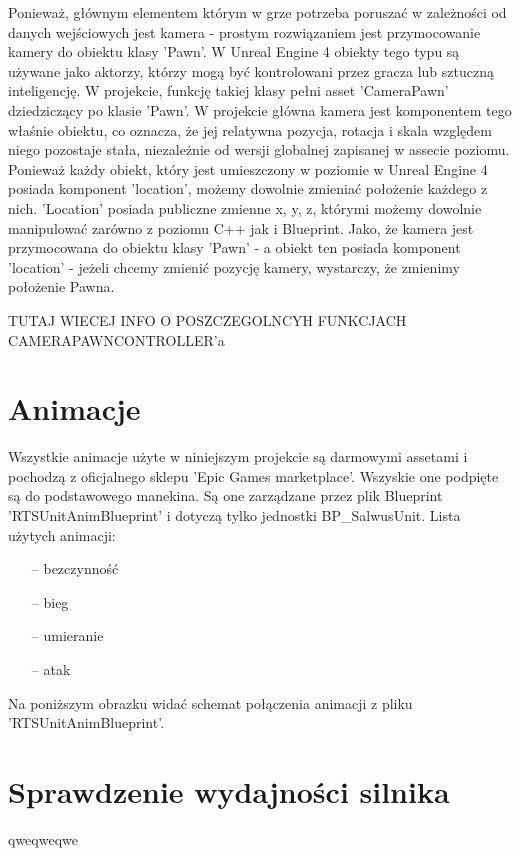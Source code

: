 \documentclass[12pt]{report}
\begin{document}
Ponieważ, głównym elementem którym w grze potrzeba poruszać w zależności od danych wejściowych jest kamera - prostym rozwiązaniem jest przymocowanie kamery do obiektu klasy 'Pawn'. W Unreal Engine 4 obiekty tego typu są używane jako aktorzy, którzy mogą być kontrolowani przez gracza lub sztuczną inteligencję. W projekcie, funkcję takiej klasy pełni asset 'CameraPawn' dziedziczący po klasie 'Pawn'. W projekcie główna kamera jest komponentem tego właśnie obiektu, co oznacza, że jej relatywna pozycja, rotacja i skala względem niego pozostaje stała, niezależnie od wersji globalnej zapisanej w assecie poziomu. Ponieważ każdy obiekt, który jest umieszczony w poziomie w Unreal Engine 4 posiada komponent 'location', możemy dowolnie zmieniać położenie każdego z nich. 'Location' posiada publiczne zmienne x, y, z, którymi możemy dowolnie manipulować zarówno z poziomu C++ jak i Blueprint. Jako, że kamera jest przymocowana do obiektu klasy 'Pawn' - a obiekt ten posiada komponent 'location' - jeżeli chcemy zmienić pozycję kamery, wystarczy, że zmienimy położenie Pawna.

TUTAJ WIECEJ INFO O POSZCZEGOLNCYH FUNKCJACH CAMERAPAWNCONTROLLER'a



\section{Animacje}
Wszystkie animacje użyte w niniejszym projekcie są darmowymi assetami i pochodzą z oficjalnego sklepu 'Epic Games marketplace'. Wszyskie one podpięte są do podstawowego manekina. Są one zarządzane przez plik Blueprint 'RTSUnitAnimBlueprint' i dotyczą tylko jednostki BP_SalwusUnit. Lista użytych animacji:
\begin{itemize}
\item[--] bezczynność 
\item[--] bieg
\item[--] umieranie 
\item[--] atak 
\end{itemize}

Na poniższym obrazku widać schemat połączenia animacji z pliku 'RTSUnitAnimBlueprint'.



\section{Sprawdzenie wydajności silnika}
qweqweqwe
\end{document}
